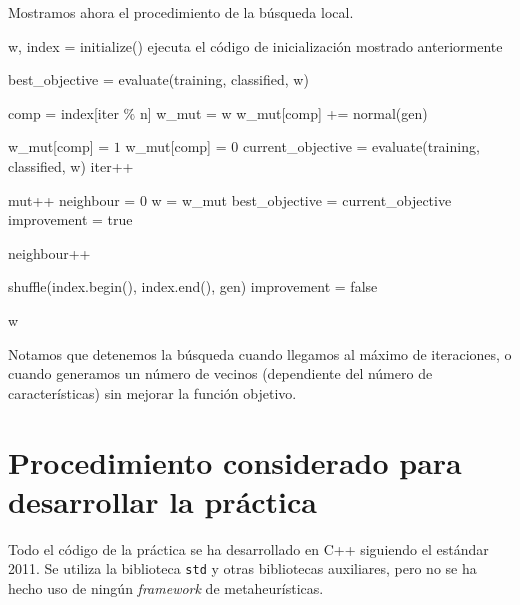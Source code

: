 \documentclass[12pt]{article}
\begin{document}
Mostramos ahora el procedimiento de la búsqueda local.

\begin{algorithm}[h!]
\begin{algorithmic}


\State w, index = initialize() \Comment ejecuta el código de inicialización mostrado anteriormente

\State best\_objective = evaluate(training, classified, w)

    \State comp = index[iter $\%$ n]
    \State w\_mut = w
    \State w\_mut[comp] += normal(gen)
    
     \State w\_mut[comp] = $1$
     \State w\_mut[comp] = $0$
    \EndIf
    \State current\_objective = evaluate(training, classified, w)
    \State iter++

      \State mut++
      \State neighbour = $0$
      \State w = w\_mut
      \State best\_objective = current\_objective
      \State improvement = true

    \Else 
      \State neighbour++
    \EndIf

      \State shuffle(index.begin(), index.end(), gen)
      \State improvement = false
    \EndIf
      
\hspace{-.7em} \Return w
\EndFunction

\end{algorithmic}
\end{algorithm}

Notamos que detenemos la búsqueda cuando llegamos al máximo de iteraciones, o cuando generamos un número de vecinos (dependiente del número de características) sin mejorar la función objetivo.

\newpage

\section{Procedimiento considerado para desarrollar la práctica}

Todo el código de la práctica se ha desarrollado en C++ siguiendo el estándar 2011. Se utiliza la biblioteca \verb|std| y otras bibliotecas auxiliares, pero no se ha hecho uso de ningún \textit{framework} de metaheurísticas.\\
\end{document}
